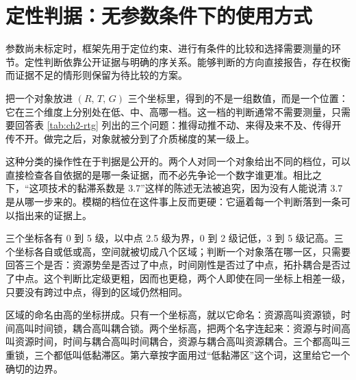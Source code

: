 \section{定性判据：无参数条件下的使用方式}

参数尚未标定时，框架先用于定位约束、进行有条件的比较和选择需要测量的环节。定性判断依靠公开证据与明确的序关系。能够判断的方向直接报告，存在权衡而证据不足的情形则保留为待比较的方案。


把一个对象放进 $(R,\,T,\,G)$ 三个坐标里，得到的不是一组数值，而是一个位置：它在三个维度上分别处在低、中、高哪一档。这一档的判断通常不需要测量，只需要回答表 \ref{tab:ch2-rtg} 列出的三个问题：推得动推不动、来得及来不及、传得开传不开。做完之后，对象就被分到了介质梯度的某一级上。

这种分类的操作性在于判据是公开的。两个人对同一个对象给出不同的档位，可以直接检查各自依据的是哪一条证据，而不必先争论一个数字谁更准。相比之下，“这项技术的黏滞系数是 3.7”这样的陈述无法被追究，因为没有人能说清 3.7 是从哪一步来的。模糊的档位在这件事上反而更硬：它逼着每一个判断落到一条可以指出来的证据上。


三个坐标各有 0 到 5 级，以中点 2.5 级为界，0 到 2 级记低，3 到 5 级记高。三个坐标各自或低或高，空间就被切成八个区域；判断一个对象落在哪一区，只需要回答三个是否：资源势垒是否过了中点，时间刚性是否过了中点，拓扑耦合是否过了中点。这个判断比定级更粗，因而也更稳，两个人即使在同一坐标上相差一级，只要没有跨过中点，得到的区域仍然相同。

区域的命名由高的坐标拼成。只有一个坐标高，就以它命名：资源高叫资源锁，时间高叫时间锁，耦合高叫耦合锁。两个坐标高，把两个名字连起来：资源与时间高叫资源时间，时间与耦合高叫时间耦合，资源与耦合高叫资源耦合。三个都高叫三重锁，三个都低叫低黏滞区。第六章按字面用过“低黏滞区”这个词，这里给它一个确切的边界。

